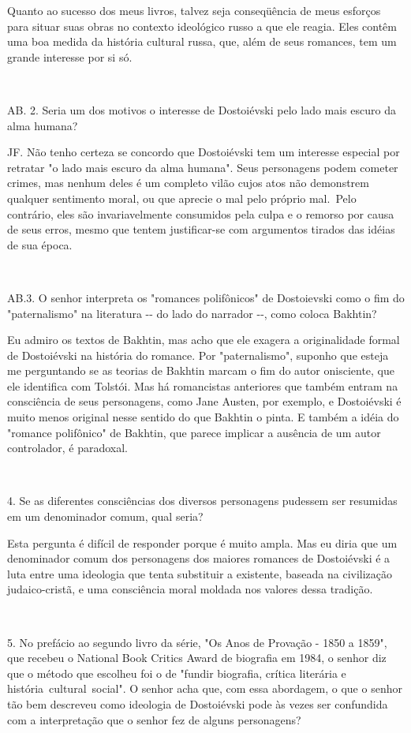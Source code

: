 Quanto ao sucesso dos meus livros, talvez seja conseqüência de meus
esforços para situar suas obras no contexto ideológico russo a que ele
reagia. Eles contêm uma boa medida da história cultural russa, que, além
de seus romances, tem um grande interesse por si só.

~

AB. 2. Seria um dos motivos o interesse de Dostoiévski pelo lado mais
escuro da alma humana?

JF. Não tenho certeza se concordo que Dostoiévski tem um interesse
especial por retratar "o lado mais escuro da alma humana". Seus
personagens podem cometer crimes, mas nenhum deles é um completo vilão
cujos atos não demonstrem qualquer sentimento moral, ou que aprecie o
mal pelo próprio mal.~Pelo contrário, eles são invariavelmente
consumidos pela culpa e o remorso por causa de seus erros, mesmo que
tentem justificar-se com argumentos tirados das idéias de sua época.

~

AB.3. O senhor interpreta os "romances polifônicos" de Dostoievski como
o fim do "paternalismo" na literatura -\/- do lado do narrador -\/-,
como coloca Bakhtin?

Eu admiro os textos de Bakhtin, mas acho que ele exagera a originalidade
formal de Dostoiévski na história do romance. Por "paternalismo",
suponho que esteja me perguntando se as teorias de Bakhtin marcam o fim
do autor onisciente, que ele identifica com Tolstói. Mas há romancistas
anteriores que também entram na consciência de seus personagens, como
Jane Austen, por exemplo, e Dostoiévski é muito menos original nesse
sentido do que Bakhtin o pinta. E também a idéia do "romance polifônico"
de Bakhtin, que parece implicar a ausência de um autor controlador, é
paradoxal.

~

4. Se as diferentes consciências dos diversos personagens pudessem ser
resumidas em um denominador comum, qual seria?

Esta pergunta é difícil de responder porque é muito ampla. Mas eu diria
que um denominador comum dos personagens dos maiores romances de
Dostoiévski é a luta entre uma ideologia que tenta substituir a
existente, baseada na civilização judaico-cristã, e uma consciência
moral moldada nos valores dessa tradição.

~

5. No prefácio ao segundo livro da série, "Os Anos de Provação - 1850 a
1859", que recebeu o National Book Critics Award de biografia em 1984, o
senhor diz que o método que escolheu foi o de "fundir biografia, crítica
literária e história~cultural~social". O senhor acha que, com essa
abordagem, o que o senhor tão bem descreveu como ideologia de
Dostoiévski pode às vezes ser confundida com a interpretação que o
senhor fez de alguns personagens?

